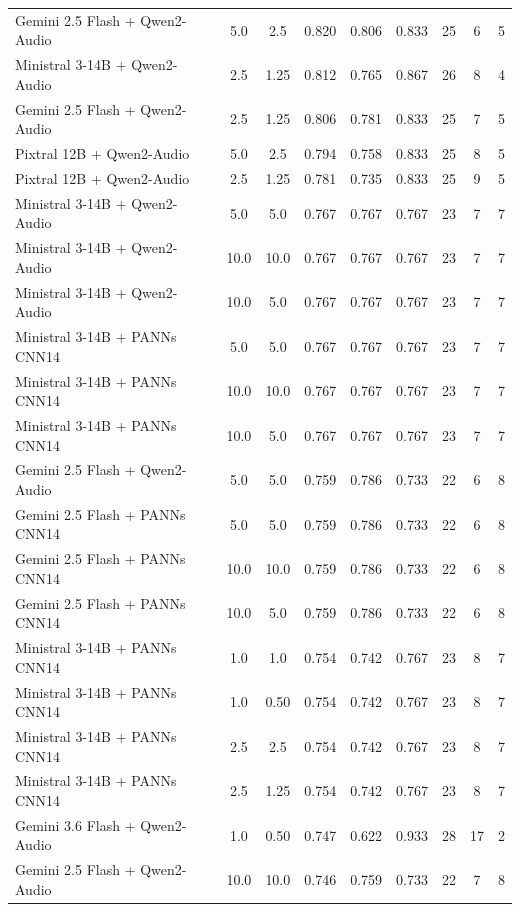 {\begin{longtable}{lcccccccc}
    Gemini 2.5 Flash + Qwen2-Audio & 5.0 & 2.5 & 0.820 & 0.806 & 0.833 & 25 & 6 & 5 \\
    Ministral 3-14B + Qwen2-Audio & 2.5 & 1.25 & 0.812 & 0.765 & 0.867 & 26 & 8 & 4 \\
    Gemini 2.5 Flash + Qwen2-Audio & 2.5 & 1.25 & 0.806 & 0.781 & 0.833 & 25 & 7 & 5 \\
    Pixtral 12B + Qwen2-Audio & 5.0 & 2.5 & 0.794 & 0.758 & 0.833 & 25 & 8 & 5 \\
    Pixtral 12B + Qwen2-Audio & 2.5 & 1.25 & 0.781 & 0.735 & 0.833 & 25 & 9 & 5 \\
    Ministral 3-14B + Qwen2-Audio & 5.0 & 5.0 & 0.767 & 0.767 & 0.767 & 23 & 7 & 7 \\
    Ministral 3-14B + Qwen2-Audio & 10.0 & 10.0 & 0.767 & 0.767 & 0.767 & 23 & 7 & 7 \\
    Ministral 3-14B + Qwen2-Audio & 10.0 & 5.0 & 0.767 & 0.767 & 0.767 & 23 & 7 & 7 \\
    Ministral 3-14B + PANNs CNN14 & 5.0 & 5.0 & 0.767 & 0.767 & 0.767 & 23 & 7 & 7 \\
    Ministral 3-14B + PANNs CNN14 & 10.0 & 10.0 & 0.767 & 0.767 & 0.767 & 23 & 7 & 7 \\
    Ministral 3-14B + PANNs CNN14 & 10.0 & 5.0 & 0.767 & 0.767 & 0.767 & 23 & 7 & 7 \\
    Gemini 2.5 Flash + Qwen2-Audio & 5.0 & 5.0 & 0.759 & 0.786 & 0.733 & 22 & 6 & 8 \\
    Gemini 2.5 Flash + PANNs CNN14 & 5.0 & 5.0 & 0.759 & 0.786 & 0.733 & 22 & 6 & 8 \\
    Gemini 2.5 Flash + PANNs CNN14 & 10.0 & 10.0 & 0.759 & 0.786 & 0.733 & 22 & 6 & 8 \\
    Gemini 2.5 Flash + PANNs CNN14 & 10.0 & 5.0 & 0.759 & 0.786 & 0.733 & 22 & 6 & 8 \\
    Ministral 3-14B + PANNs CNN14 & 1.0 & 1.0 & 0.754 & 0.742 & 0.767 & 23 & 8 & 7 \\
    Ministral 3-14B + PANNs CNN14 & 1.0 & 0.50 & 0.754 & 0.742 & 0.767 & 23 & 8 & 7 \\
    Ministral 3-14B + PANNs CNN14 & 2.5 & 2.5 & 0.754 & 0.742 & 0.767 & 23 & 8 & 7 \\
    Ministral 3-14B + PANNs CNN14 & 2.5 & 1.25 & 0.754 & 0.742 & 0.767 & 23 & 8 & 7 \\
    Gemini 3.6 Flash + Qwen2-Audio & 1.0 & 0.50 & 0.747 & 0.622 & 0.933 & 28 & 17 & 2 \\
    Gemini 2.5 Flash + Qwen2-Audio & 10.0 & 10.0 & 0.746 & 0.759 & 0.733 & 22 & 7 & 8 \\

\end{longtable}}
